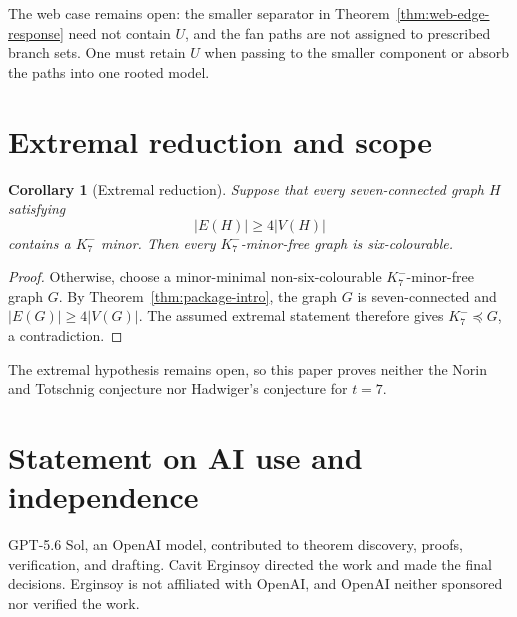 \documentclass[11pt]{amsart}
\newtheorem{corollary}[theorem]{Corollary}
\newcommand{\minor}{\preccurlyeq}
\begin{document}
The web case remains open: the smaller separator in
Theorem~\ref{thm:web-edge-response} need not contain $U$, and the fan paths
are not assigned to prescribed branch sets.  One must retain $U$ when passing
to the smaller component or absorb the paths into one rooted model.

\section{Extremal reduction and scope}

\begin{corollary}[Extremal reduction]\label{cor:extremal-reduction}
Suppose that every seven-connected graph $H$ satisfying
\[
        |E(H)|\geq4|V(H)|
\]
contains a $K_7^{-}$ minor.  Then every $K_7^{-}$-minor-free graph is
six-colourable.
\end{corollary}

\begin{proof}
Otherwise, choose a minor-minimal non-six-colourable
$K_7^{-}$-minor-free graph $G$.  By Theorem~\ref{thm:package-intro}, the
graph $G$ is seven-connected and $|E(G)|\geq4|V(G)|$.  The assumed
extremal statement therefore gives $K_7^{-}\minor G$, a contradiction.
\end{proof}

The extremal hypothesis remains open, so this paper proves neither the Norin
and Totschnig conjecture nor Hadwiger's conjecture for $t=7$.

\section*{Statement on AI use and independence}

GPT-5.6 Sol, an OpenAI model, contributed to theorem discovery, proofs,
verification, and drafting.  Cavit Erginsoy directed the work and made the
final decisions.  Erginsoy is not affiliated with OpenAI, and OpenAI neither
sponsored nor verified the work.

{


}
\end{document}
